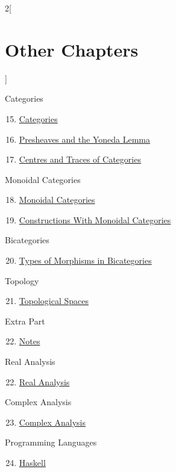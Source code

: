 \begin{multicols}{2}[\section{Other Chapters}]
\begin{enumerate}
\end{enumerate}
Categories
\begin{enumerate}
\setcounter{enumi}{14}
\item \hyperref[categories:section-phantom]{Categories}
\item \hyperref[presheaves-and-the-yoneda-lemma:section-phantom]{Presheaves and the Yoneda Lemma}
\item \hyperref[centres-and-traces-of-categories:section-phantom]{Centres and Traces of Categories}
\end{enumerate}
Monoidal Categories
\begin{enumerate}
\setcounter{enumi}{17}
\item \hyperref[monoidal-categories:section-phantom]{Monoidal Categories}
\item \hyperref[constructions-with-monoidal-categories:section-phantom]{Constructions With Monoidal Categories}
\end{enumerate}
Bicategories
\begin{enumerate}
\setcounter{enumi}{19}
\item \hyperref[types-of-morphisms-in-bicategories:section-phantom]{Types of Morphisms in Bicategories}
\end{enumerate}
Topology
\begin{enumerate}
\setcounter{enumi}{20}
\item \hyperref[topological-spaces:section-phantom]{Topological Spaces}
\end{enumerate}
Extra Part
\begin{enumerate}
\setcounter{enumi}{21}
\item \hyperref[notes:section-phantom]{Notes}
\end{enumerate}
Real Analysis
\begin{enumerate}
\setcounter{enumi}{21}
\item \hyperref[real-analysis:section-phantom]{Real Analysis}
\end{enumerate}
Complex Analysis
\begin{enumerate}
\setcounter{enumi}{22}
\item \hyperref[complex-analysis:section-phantom]{Complex Analysis}
\end{enumerate}
Programming Languages
\begin{enumerate}
\setcounter{enumi}{23}
\item \hyperref[haskell:section-phantom]{Haskell}
\end{enumerate}
\end{multicols}
